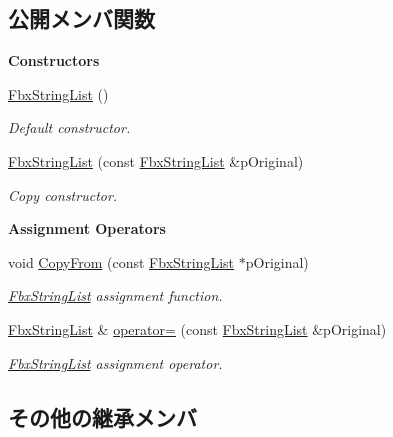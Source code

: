 \subsection*{公開メンバ関数}
\begin{Indent}\textbf{ Constructors}\par
\begin{DoxyCompactItemize}
\item 
\hyperlink{class_fbx_string_list_a412df9e48bc17c5c1fdfbea296855196}{Fbx\+String\+List} ()
\begin{DoxyCompactList}\small\item\em Default constructor. \end{DoxyCompactList}\item 
\hyperlink{class_fbx_string_list_a2bf8796a8d075564468db9aa188b4f31}{Fbx\+String\+List} (const \hyperlink{class_fbx_string_list}{Fbx\+String\+List} \&p\+Original)
\begin{DoxyCompactList}\small\item\em Copy constructor. \end{DoxyCompactList}\end{DoxyCompactItemize}
\end{Indent}
\begin{Indent}\textbf{ Assignment Operators}\par
\begin{DoxyCompactItemize}
\item 
void \hyperlink{class_fbx_string_list_a7d488c296b284ff595d9ab31b34d4702}{Copy\+From} (const \hyperlink{class_fbx_string_list}{Fbx\+String\+List} $\ast$p\+Original)
\begin{DoxyCompactList}\small\item\em \hyperlink{class_fbx_string_list}{Fbx\+String\+List} assignment function. \end{DoxyCompactList}\item 
\hyperlink{class_fbx_string_list}{Fbx\+String\+List} \& \hyperlink{class_fbx_string_list_a01f1736c5ba0e59ebfb601e620d8555f}{operator=} (const \hyperlink{class_fbx_string_list}{Fbx\+String\+List} \&p\+Original)
\begin{DoxyCompactList}\small\item\em \hyperlink{class_fbx_string_list}{Fbx\+String\+List} assignment operator. \end{DoxyCompactList}\end{DoxyCompactItemize}
\end{Indent}
\subsection*{その他の継承メンバ}


